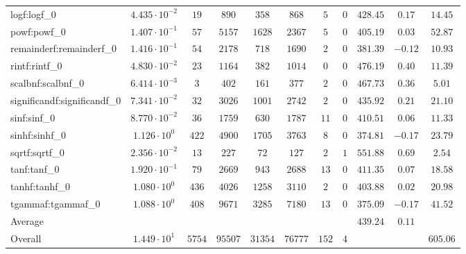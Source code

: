 \begin{tabular}{|l|c|c|c|c|c|c|c|c|c|c|}
logf:logf\_0                 & $ 4.435 \cdot 10^{-2} $ & $ 19     $ & $ 890   $ & $ 358   $ & $ 868   $ & $ 5   $ & $ 0 $ & $ 428.45      $ & $ 0.17    $ & $ 14.45   $ \\
powf:powf\_0                 & $ 1.407 \cdot 10^{-1} $ & $ 57     $ & $ 5157  $ & $ 1628  $ & $ 2367  $ & $ 5   $ & $ 0 $ & $ 405.19      $ & $ 0.03    $ & $ 52.87   $ \\
remainderf:remainderf\_0     & $ 1.416 \cdot 10^{-1} $ & $ 54     $ & $ 2178  $ & $ 718   $ & $ 1690  $ & $ 2   $ & $ 0 $ & $ 381.39      $ & $ -0.12   $ & $ 10.93   $ \\
rintf:rintf\_0               & $ 4.830 \cdot 10^{-2} $ & $ 23     $ & $ 1164  $ & $ 382   $ & $ 1014  $ & $ 0   $ & $ 0 $ & $ 476.19      $ & $ 0.40    $ & $ 11.39   $ \\
scalbnf:scalbnf\_0           & $ 6.414 \cdot 10^{-3} $ & $ 3      $ & $ 402   $ & $ 161   $ & $ 377   $ & $ 2   $ & $ 0 $ & $ 467.73      $ & $ 0.36    $ & $ 5.01    $ \\
significandf:significandf\_0 & $ 7.341 \cdot 10^{-2} $ & $ 32     $ & $ 3026  $ & $ 1001  $ & $ 2742  $ & $ 2   $ & $ 0 $ & $ 435.92      $ & $ 0.21    $ & $ 21.10   $ \\
sinf:sinf\_0                 & $ 8.770 \cdot 10^{-2} $ & $ 36     $ & $ 1759  $ & $ 630   $ & $ 1787  $ & $ 11  $ & $ 0 $ & $ 410.51      $ & $ 0.06    $ & $ 11.33   $ \\
sinhf:sinhf\_0               & $ 1.126 \cdot 10^{0}  $ & $ 422    $ & $ 4900  $ & $ 1705  $ & $ 3763  $ & $ 8   $ & $ 0 $ & $ 374.81      $ & $ -0.17   $ & $ 23.79   $ \\
sqrtf:sqrtf\_0               & $ 2.356 \cdot 10^{-2} $ & $ 13     $ & $ 227   $ & $ 72    $ & $ 127   $ & $ 2   $ & $ 1 $ & $ 551.88      $ & $ 0.69    $ & $ 2.54    $ \\
tanf:tanf\_0                 & $ 1.920 \cdot 10^{-1} $ & $ 79     $ & $ 2669  $ & $ 943   $ & $ 2688  $ & $ 13  $ & $ 0 $ & $ 411.35      $ & $ 0.07    $ & $ 18.58   $ \\
tanhf:tanhf\_0               & $ 1.080 \cdot 10^{0}  $ & $ 436    $ & $ 4026  $ & $ 1258  $ & $ 3110  $ & $ 2   $ & $ 0 $ & $ 403.88      $ & $ 0.02    $ & $ 20.98   $ \\
tgammaf:tgammaf\_0           & $ 1.088 \cdot 10^{0}  $ & $ 408    $ & $ 9671  $ & $ 3285  $ & $ 7180  $ & $ 13  $ & $ 0 $ & $ 375.09      $ & $ -0.17   $ & $ 41.52   $ \\
\hline
Average                      & $                     $ & $        $ & $       $ & $       $ & $       $ & $     $ & $   $ & $ 439.24      $ & $ 0.11    $ & $         $ \\
\hline
Overall                      & $ 1.449 \cdot 10^{1}  $ & $ 5754   $ & $ 95507 $ & $ 31354 $ & $ 76777 $ & $ 152 $ & $ 4 $ & $             $ & $         $ & $ 605.06  $ \\
\hline
\end{tabular}
